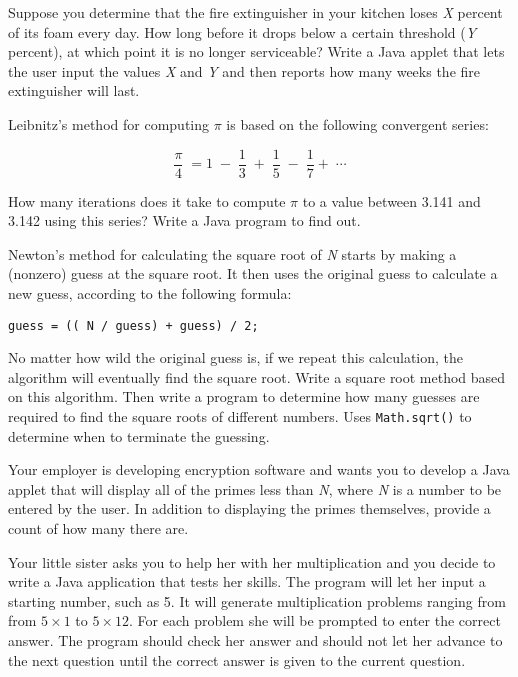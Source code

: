 \begin{EXRtwo}
\item  Suppose you determine that the fire extinguisher in your
kitchen loses {\it X} percent of its foam every day. How long before
it drops below a certain threshold ({\it Y} percent), at which point
it is no longer serviceable?  Write a Java applet that lets the user
input the values {\it X} and {\it Y} and then reports how many weeks
the fire extinguisher will last.

\item  Leibnitz's method for computing $\pi$ is based on the following
convergent series:

\begin{displaymath}
  \frac{\pi}{4} \; = 1 \; - \; \frac{1}{3} \; + \; \frac{1}{5} \; - \; \frac{1}{7} + \; \cdots
\end{displaymath}

\noindent How many iterations does it take to compute $\pi$ to 
a value between 3.141 and 3.142 using this series? Write a Java
program to find out.

\item  Newton's method for calculating the square root of {\it N} starts
by making a (nonzero) guess at the square root. It then
uses the original guess to calculate a new guess, according to
the following formula:

\begin{jjjlisting}
\begin{lstlisting}
guess = (( N / guess) + guess) / 2;
\end{lstlisting}
\end{jjjlisting}

\noindent No matter how wild the original guess is, if we repeat
this calculation, the algorithm will eventually find the square
root.  Write a square root method based on this algorithm. Then write
a program to determine how many guesses are required to find the
square roots of different numbers. Uses {\tt Math.sqrt()} to determine
when to terminate the guessing.

\item  Your employer is developing encryption software and wants you
to develop a Java applet that will display all of the primes less than
{\it N}, where {\it N} is a number to be entered by the user. In
addition to displaying the primes themselves, provide a count of how
many there are. 

\item  Your little sister asks you to help her with her
multiplication and you decide to write a Java application that tests
her skills. The program will let her input a starting number, such as
5. It will generate multiplication problems ranging from from $5
\times 1$ to $5 \times 12$. For each problem she will be prompted to
enter the correct answer. The program should check her answer and
should not let her advance to the next question until the correct
answer is given to the current question.


\end{EXRtwo}
